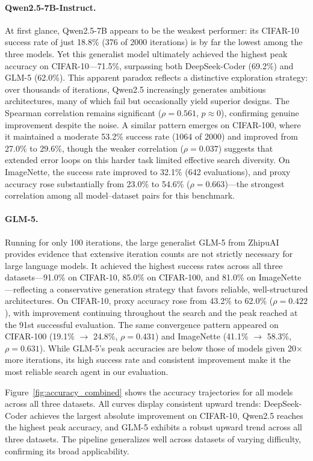\documentclass[10pt,twocolumn,letterpaper]{article}
\begin{document}
	\paragraph{Qwen2.5-7B-Instruct.} At first glance, Qwen2.5-7B appears to be the weakest performer: its CIFAR-10 success rate of just 18.8\% (376 of 2000 iterations) is by far the lowest among the three models. Yet this generalist model ultimately achieved the highest peak accuracy on CIFAR-10---71.5\%, surpassing both DeepSeek-Coder (69.2\%) and GLM-5 (62.0\%). This apparent paradox reflects a distinctive exploration strategy: over thousands of iterations, Qwen2.5 increasingly generates ambitious architectures, many of which fail but occasionally yield superior designs. The Spearman correlation remains significant ($\rho = 0.561$, $p \approx 0$), confirming genuine improvement despite the noise. A similar pattern emerges on CIFAR-100, where it maintained a moderate 53.2\% success rate (1064 of 2000) and improved from 27.0\% to 29.6\%, though the weaker correlation ($\rho = 0.037$) suggests that extended error loops on this harder task limited effective search diversity. On ImageNette, the success rate improved to 32.1\% (642 evaluations), and proxy accuracy rose substantially from 23.0\% to 54.6\% ($\rho = 0.663$)---the strongest correlation among all model--dataset pairs for this benchmark.

	\paragraph{GLM-5.} Running for only 100 iterations, the large generalist GLM-5 from ZhipuAI provides evidence that extensive iteration counts are not strictly necessary for large language models. It achieved the highest success rates across all three datasets---91.0\% on CIFAR-10, 85.0\% on CIFAR-100, and 81.0\% on ImageNette---reflecting a conservative generation strategy that favors reliable, well-structured architectures. On CIFAR-10, proxy accuracy rose from 43.2\% to 62.0\% ($\rho = 0.422$), with improvement continuing throughout the search and the peak reached at the 91st successful evaluation. The same convergence pattern appeared on CIFAR-100 (19.1\% $\to$ 24.8\%, $\rho = 0.431$) and ImageNette (41.1\% $\to$ 58.3\%, $\rho = 0.631$). While GLM-5's peak accuracies are below those of models given 20$\times$ more iterations, its high success rate and consistent improvement make it the most reliable search agent in our evaluation.

	Figure~\ref{fig:accuracy_combined} shows the accuracy trajectories for all models across all three datasets. All curves display consistent upward trends: DeepSeek-Coder achieves the largest absolute improvement on CIFAR-10, Qwen2.5 reaches the highest peak accuracy, and GLM-5 exhibits a robust upward trend across all three datasets. The pipeline generalizes well across datasets of varying difficulty, confirming its broad applicability.
	
\end{document}

